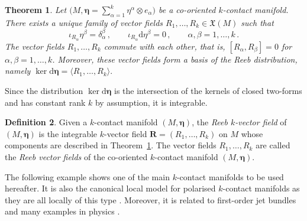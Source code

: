 \documentclass[11pt,twoside]{article}
\theoremstyle{plain}
\newtheorem{theorem}{Theorem}[section]
\theoremstyle{definition}
\newtheorem{definition}[theorem]{Definition}
\theoremstyle{remark}
\newcommand{\dd}{\mathrm{d}}
\newcommand*{\inn}[1]{\iota_{#1}}
\begin{document}
\begin{theorem}
\label{thm:k-contact-Reeb}
Let $\big(M,\bm\eta = \sum_{\alpha=1}^k \eta^\alpha \otimes e_\alpha\big)$ be a co-oriented $k$-contact manifold. There exists a unique family of  vector fields $R_1,\dotsc,R_k \in \mathfrak{X}(M)$ such that
\begin{equation}\label{eq:k-contact-Reeb} 
\inn{R_\alpha} \eta^\beta = \delta_\alpha^\beta\,,\qquad 
\inn{R_\alpha} \dd \eta^\beta = 0\,, \qquad \alpha,\beta = 1,\dotsc,k\,.
\end{equation}
The vector fields $R_1,\dotsc,R_k$ commute with each other, that is,
\(
[R_\alpha, R_\beta] = 0
\)
for $\alpha,\beta = 1,\dotsc,k$. Moreover, these vector fields form a basis of the Reeb distribution, namely
\(
\ker \dd \bm\eta = \langle R_1,\dotsc,R_k \rangle .
\)
\end{theorem}

Since the distribution $\ker \dd \bm\eta$ is the intersection of the kernels of closed two-forms and has constant rank $k$ by assumption, it is integrable. 

\begin{definition}
Given a $k$-contact manifold $(M,\bm\eta)$, the \textit{Reeb $k$-vector field} of $(M,\bm\eta)$ is the integrable $k$-vector field
\(
\mathbf{R} = (R_1,\dotsc,R_k)
\) 
on $M$ whose components are described in Theorem~\ref{thm:k-contact-Reeb}. The vector fields $R_1,\dotsc,R_k$ are called the \textit{Reeb vector fields} of the co-oriented $k$-contact manifold $(M,\bm\eta)$.
\end{definition}

The following example shows one of the main $k$-contact manifolds to be used hereafter. It is also the canonical local model for polarised $k$-contact manifolds as they are all locally of this type \cite{LRS_25}. Moreover, it is related to first-order jet bundles and many examples in physics \cite{LRS_25}. 
\end{document}
